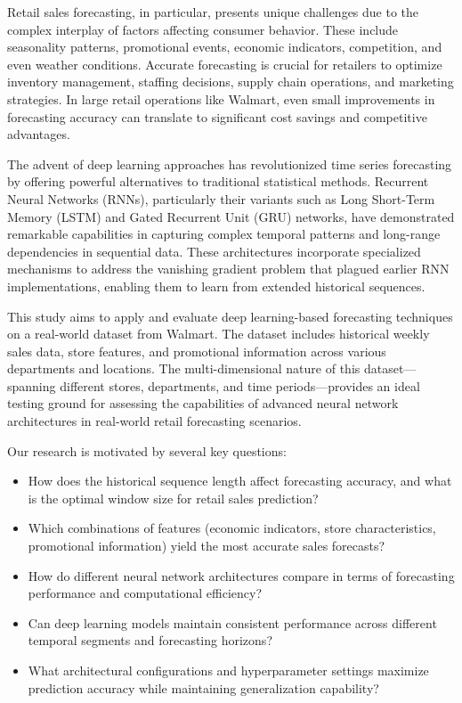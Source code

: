\documentclass[conference]{IEEEtran}
\begin{document}
Retail sales forecasting, in particular, presents unique challenges due to the complex interplay of factors affecting consumer behavior. These include seasonality patterns, promotional events, economic indicators, competition, and even weather conditions. Accurate forecasting is crucial for retailers to optimize inventory management, staffing decisions, supply chain operations, and marketing strategies. In large retail operations like Walmart, even small improvements in forecasting accuracy can translate to significant cost savings and competitive advantages.

The advent of deep learning approaches has revolutionized time series forecasting by offering powerful alternatives to traditional statistical methods. Recurrent Neural Networks (RNNs), particularly their variants such as Long Short-Term Memory (LSTM) and Gated Recurrent Unit (GRU) networks, have demonstrated remarkable capabilities in capturing complex temporal patterns and long-range dependencies in sequential data. These architectures incorporate specialized mechanisms to address the vanishing gradient problem that plagued earlier RNN implementations, enabling them to learn from extended historical sequences.

This study aims to apply and evaluate deep learning-based forecasting techniques on a real-world dataset from Walmart. The dataset includes historical weekly sales data, store features, and promotional information across various departments and locations. The multi-dimensional nature of this dataset—spanning different stores, departments, and time periods—provides an ideal testing ground for assessing the capabilities of advanced neural network architectures in real-world retail forecasting scenarios.

Our research is motivated by several key questions:
\begin{itemize}
  \item How does the historical sequence length affect forecasting accuracy, and what is the optimal window size for retail sales prediction?
  \item Which combinations of features (economic indicators, store characteristics, promotional information) yield the most accurate sales forecasts?
  \item How do different neural network architectures compare in terms of forecasting performance and computational efficiency?
  \item Can deep learning models maintain consistent performance across different temporal segments and forecasting horizons?
  \item What architectural configurations and hyperparameter settings maximize prediction accuracy while maintaining generalization capability?
\end{itemize}
\end{document}
